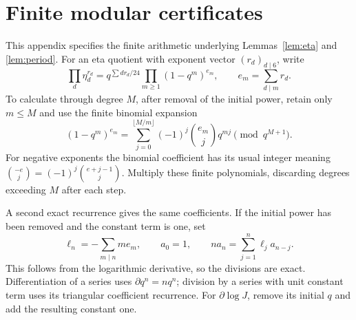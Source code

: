 \documentclass[11pt,a4paper]{article}
\theoremstyle{remark}
\newcommand{\dd}{\partial}
\begin{document}
\section{Finite modular certificates}\label{app:modular}
This appendix specifies the finite arithmetic underlying
Lemmas~\ref{lem:eta} and \ref{lem:period}. For an eta quotient
with exponent vector $(r_d)_{d\mid6}$, write
\[
 \prod_d\eta_d^{r_d}
 =q^{\sum dr_d/24}\prod_{m\ge1}(1-q^m)^{e_m},
 \qquad e_m=\sum_{d\mid m}r_d.
\]
To calculate through degree $M$, after removal of the initial power,
retain only $m\le M$ and use the finite binomial expansion
\[
 (1-q^m)^{e_m}
   =\sum_{j=0}^{\lfloor M/m\rfloor}(-1)^j\binom{e_m}j q^{mj}
                 \pmod{q^{M+1}}.
\]
For negative exponents the binomial coefficient has its usual integer
meaning $\binom{-e}j=(-1)^j\binom{e+j-1}j$. Multiply these finite
polynomials, discarding degrees exceeding $M$ after each step.

A second exact recurrence gives the same coefficients. If the
initial power has been removed and the constant term is one, set
\[
 \ell_n=-\sum_{m\mid n}m e_m,\qquad
 a_0=1,\qquad n a_n=\sum_{j=1}^n\ell_j a_{n-j}.
\]
This follows from the logarithmic derivative, so the divisions are
exact. Differentiation of a series uses $\dd q^n=nq^n$;
division by a series with unit constant term uses its triangular
coefficient recurrence. For $\dd\log J$, remove its initial $q$
and add the resulting constant one.
\end{document}
